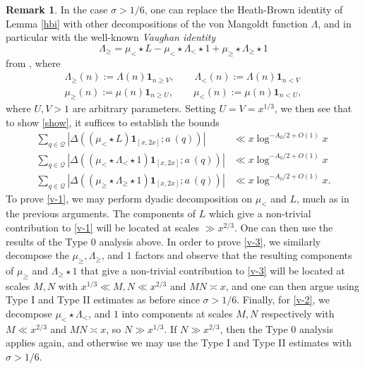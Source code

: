 \documentclass[12pt,a4paper,reqno]{amsart}
\numberwithin{equation}{section}
\theoremstyle{plain}
\theoremstyle{definition}
\newtheorem{remark}[theorem]{Remark}
\renewcommand{\sim}{\asymp}
\renewcommand{\lessapprox}{\llcurly}
\renewcommand{\gtrapprox}{\ggcurly}
\newcommand{\onef}{\mathbf{1}}
\begin{document}

\begin{remark}\label{vaughan-rem} In the case $\sigma > 1/6$, one can
  replace the Heath-Brown identity of Lemma \ref{hbi} with other
  decompositions of the von Mangoldt function $\Lambda$, and in
  particular with the well-known \emph{Vaughan identity}
$$ \Lambda_\geq = \mu_< \star  L - \mu_< \star  \Lambda_< \star  1 + \mu_\geq \star  \Lambda_\geq \star  1$$
from \cite{vaughan}, where
\begin{gather}
\Lambda_\geq(n) := \Lambda(n) \onef_{n \geq V},\quad\quad 
\Lambda_<(n) := \Lambda(n) \onef_{n < V}\\
\mu_\geq(n) := \mu(n) \onef_{n \geq U},\quad\quad \mu_<(n) := \mu(n)
\onef_{n < U},
\end{gather}
where $U,V > 1$ are arbitrary parameters.  Setting $U=V=x^{1/3}$, we
then see that to show \eqref{show}, it suffices to establish the
bounds
\begin{align}
\sum_{q \in {\mathcal Q}} |\Delta((\mu_< \star  L) \onef_{[x,2x]}; a\ (q))| &\ll x \log^{-A_0/2+O(1)} x \label{v-1} \\
\sum_{q \in {\mathcal Q}} |\Delta((\mu_< \star  \Lambda_< \star  1) \onef_{[x,2x]}; a\ (q))| &\ll x \log^{-A_0/2+O(1)} x \label{v-2} \\
\sum_{q \in {\mathcal Q}} |\Delta((\mu_\geq \star  \Lambda_\geq \star  1) \onef_{[x,2x]}; a\ (q))| &\ll x \log^{-A_0/2+O(1)} x \label{v-3}.
\end{align}
To prove \eqref{v-1}, we may perform dyadic decomposition on $\mu_<$
and $L$, much as in the previous arguments.  The components of $L$
which give a non-trivial contribution to \eqref{v-1} will be located
at scales $\gg x^{2/3}$. One can then use the results of the Type
0 analysis above.  In order to prove \eqref{v-3}, we
similarly decompose the $\mu_\geq, \Lambda_\geq$, and $1$ factors and
observe that the resulting components of $\mu_\geq$ and $\Lambda_\geq
\star 1$ that give a non-trivial contribution to \eqref{v-3} will be
located at scales $M,N$ with $x^{1/3} \ll M,N \ll x^{2/3}$ and $MN
\sim x$, and one can then argue using Type I and Type II estimates as
before since $\sigma > 1/6$.  Finally, for \eqref{v-2}, we decompose
$\mu_< \star \Lambda_<$, and $1$ into components at scales $M,N$
respectively with $M \ll x^{2/3}$ and $MN \sim x$, so $N \gg x^{1/3}$.
If $N \gg x^{2/3}$, then the Type 0 analysis applies again, and
otherwise we may use the Type I and Type II estimates with $\sigma >
1/6$.
\end{remark}
\end{document}
